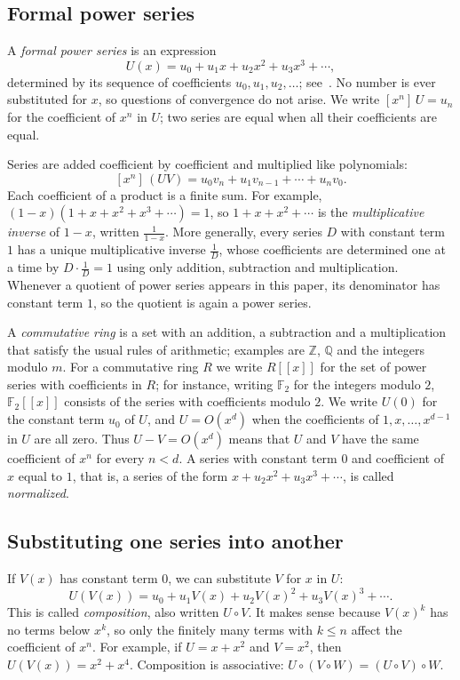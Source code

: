 \documentclass[11pt,a4paper]{article}
\theoremstyle{definition}
\theoremstyle{remark}
\newcommand{\Z}{\mathbb{Z}}
\newcommand{\Q}{\mathbb{Q}}
\newcommand{\F}{\mathbb{F}}
\newcommand{\ps}[1]{#1[[x]]}
\newcommand{\coeff}[2]{[x^{#1}]\,#2}
\begin{document}
\subsection{Formal power series}
A \emph{formal power series} is an expression
\[
U(x)=u_0+u_1x+u_2x^2+u_3x^3+\cdots ,
\]
determined by its sequence of coefficients $u_0,u_1,u_2,\dots$; see~\cite{niven,stanley}. No number is ever
substituted for $x$, so questions of convergence do not arise. We write $\coeff{n}{U}=u_n$ for the coefficient of $x^n$ in $U$; two series are equal
when all their coefficients are equal.

Series are added coefficient by coefficient and multiplied like polynomials:
\[
\coeff{n}{(UV)}=u_0v_n+u_1v_{n-1}+\cdots+u_nv_0 .
\]
Each coefficient of a product is a finite sum. For example, $(1-x)(1+x+x^2+x^3+\cdots)=1$, so $1+x+x^2+\cdots$ is
the \emph{multiplicative inverse} of $1-x$, written $\frac{1}{1-x}$. More generally, every series $D$ with constant term
$1$ has a unique multiplicative inverse $\frac1D$, whose coefficients are determined one at a time by $D\cdot\frac1D=1$
using only addition, subtraction and multiplication. Whenever a quotient of power series appears in this paper, its
denominator has constant term $1$, so the quotient is again a power series.

A \emph{commutative ring} is a set with an addition, a subtraction and a multiplication that satisfy the usual rules
of arithmetic; examples are $\Z$, $\Q$ and the integers modulo $m$. For a commutative ring $R$ we write $\ps{R}$ for
the set of power series with coefficients in $R$; for instance, writing $\F_2$ for the integers modulo $2$, $\ps{\F_2}$
consists of the series with coefficients modulo $2$. We write
$U(0)$ for the constant term $u_0$ of $U$, and $U=O(x^d)$ when the coefficients of $1,x,\dots,x^{d-1}$ in $U$ are all
zero. Thus $U-V=O(x^d)$ means that $U$ and $V$ have the same coefficient of $x^n$ for every $n<d$. A series with
constant term $0$ and coefficient of $x$ equal to $1$, that is, a series of the form $x+u_2x^2+u_3x^3+\cdots$, is
called \emph{normalized}.

\subsection{Substituting one series into another}
If $V(x)$ has constant term $0$, we can substitute $V$ for $x$ in $U$:
\[
U(V(x))=u_0+u_1V(x)+u_2V(x)^2+u_3V(x)^3+\cdots .
\]
This is called \emph{composition}, also written $U\circ V$. It makes sense because $V(x)^k$ has no terms below $x^k$,
so only the finitely many terms with $k\le n$ affect the coefficient of $x^n$. For example, if $U=x+x^2$ and $V=x^2$, then
$U(V(x))=x^2+x^4$. Composition is associative: $U\circ(V\circ W)=(U\circ V)\circ W$.
\end{document}
